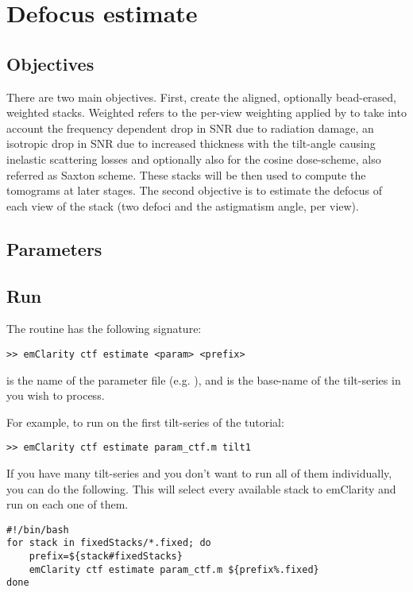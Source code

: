 \section{Defocus estimate} \label{sec:defocus_estimate}

\subsection{Objectives}

There are two main objectives. First, create the aligned, optionally bead-erased, weighted stacks. Weighted refers to the per-view weighting applied by {\emClarity} to take into account the frequency dependent drop in SNR due to radiation damage, an isotropic drop in SNR due to increased thickness with the tilt-angle causing inelastic scattering losses and optionally also for the cosine dose-scheme, also referred as Saxton scheme. These stacks will be then used to compute the tomograms at later stages. The second objective is to estimate the defocus of each view of the stack (two defoci and the astigmatism angle, per view).

\subsection{Parameters}



\subsection{Run}

The  routine has the following signature:
\begin{lstlisting}
>> emClarity ctf estimate <param> <prefix>
\end{lstlisting}
 is the name of the parameter file (e.g. ), and  is the base-name of the tilt-series in  you wish to process.

For example, to run  on the first tilt-series of the tutorial:
\begin{lstlisting}
>> emClarity ctf estimate param_ctf.m tilt1
\end{lstlisting}

If you have many tilt-series and you don't want to run all of them individually, you can do the following. This will select every available stack to emClarity and run  on each one of them.
\begin{lstlisting}
#!/bin/bash
for stack in fixedStacks/*.fixed; do
    prefix=${stack#fixedStacks}
    emClarity ctf estimate param_ctf.m ${prefix%.fixed}
done
\end{lstlisting}

